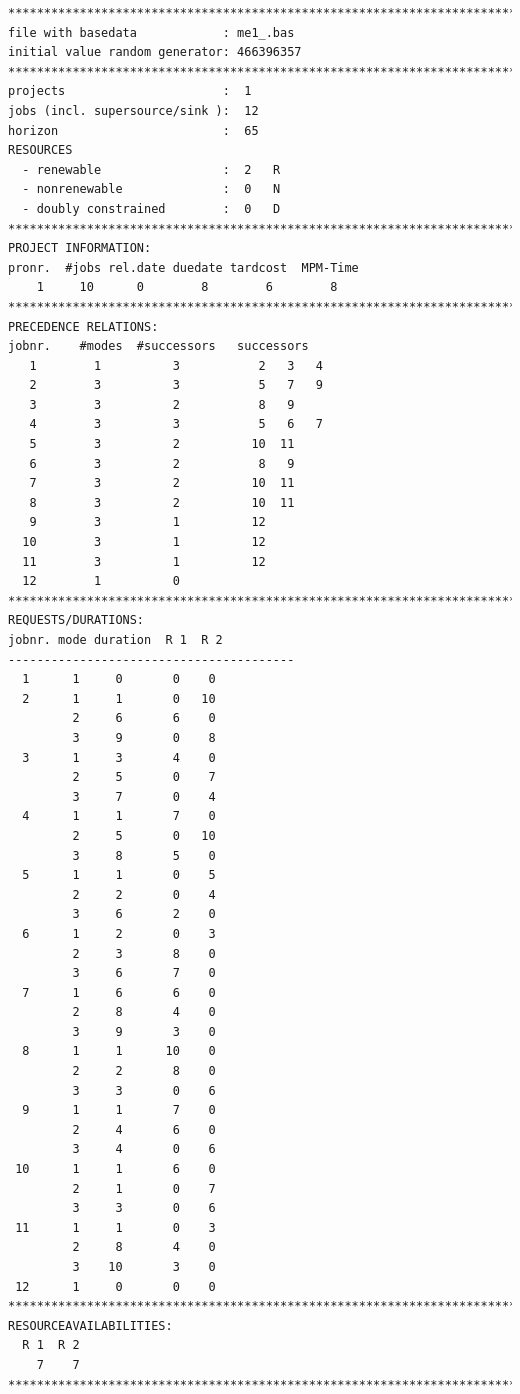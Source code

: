 \begin{lstlisting}[caption={Instanz n01\_2.mm der PSPLIB n0 (Quelle:  \cite{kolisch_psplib_1997})}, label=lst:psplib_n0_example, basicstyle=\scriptsize, breaklines=true,breakatwhitespace=true, columns=flexible]
************************************************************************
file with basedata            : me1_.bas
initial value random generator: 466396357
************************************************************************
projects                      :  1
jobs (incl. supersource/sink ):  12
horizon                       :  65
RESOURCES
  - renewable                 :  2   R
  - nonrenewable              :  0   N
  - doubly constrained        :  0   D
************************************************************************
PROJECT INFORMATION:
pronr.  #jobs rel.date duedate tardcost  MPM-Time
    1     10      0        8        6        8
************************************************************************
PRECEDENCE RELATIONS:
jobnr.    #modes  #successors   successors
   1        1          3           2   3   4
   2        3          3           5   7   9
   3        3          2           8   9
   4        3          3           5   6   7
   5        3          2          10  11
   6        3          2           8   9
   7        3          2          10  11
   8        3          2          10  11
   9        3          1          12
  10        3          1          12
  11        3          1          12
  12        1          0        
************************************************************************
REQUESTS/DURATIONS:
jobnr. mode duration  R 1  R 2
----------------------------------------
  1      1     0       0    0
  2      1     1       0   10
         2     6       6    0
         3     9       0    8
  3      1     3       4    0
         2     5       0    7
         3     7       0    4
  4      1     1       7    0
         2     5       0   10
         3     8       5    0
  5      1     1       0    5
         2     2       0    4
         3     6       2    0
  6      1     2       0    3
         2     3       8    0
         3     6       7    0
  7      1     6       6    0
         2     8       4    0
         3     9       3    0
  8      1     1      10    0
         2     2       8    0
         3     3       0    6
  9      1     1       7    0
         2     4       6    0
         3     4       0    6
 10      1     1       6    0
         2     1       0    7
         3     3       0    6
 11      1     1       0    3
         2     8       4    0
         3    10       3    0
 12      1     0       0    0
************************************************************************
RESOURCEAVAILABILITIES:
  R 1  R 2
    7    7
************************************************************************
\end{lstlisting}

